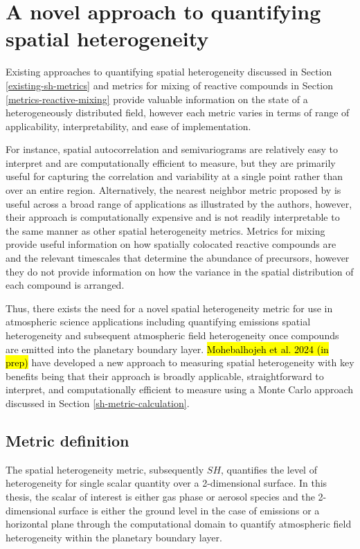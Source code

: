 \section{A novel approach to quantifying spatial heterogeneity}
Existing approaches to quantifying spatial heterogeneity discussed in Section \ref{existing-sh-metrics} and metrics for mixing of reactive compounds in Section \ref{metrics-reactive-mixing} provide valuable information on the state of a heterogeneously distributed field, however each metric varies in terms of range of applicability, interpretability, and ease of implementation. 

For instance, spatial autocorrelation and semivariograms are relatively easy to interpret and are computationally efficient to measure, but they are primarily useful for capturing the correlation and variability at a single point rather than over an entire region. Alternatively, the nearest neighbor metric proposed by \cite{shu_quantifying_2019} is useful across a broad range of applications as illustrated by the authors, however, their approach is computationally expensive and is not readily interpretable to the same manner as other spatial heterogeneity metrics. Metrics for mixing provide useful information on how spatially colocated reactive compounds are and the relevant timescales that determine the abundance of precursors, however they do not provide information on how the variance in the spatial distribution of each compound is arranged. 

Thus, there exists the need for a novel spatial heterogeneity metric for use in atmospheric science applications including quantifying emissions spatial heterogeneity and subsequent atmospheric field heterogeneity once compounds are emitted into the planetary boundary layer. \hl{Mohebalhojeh et al. 2024 (in prep)} have developed a new approach to measuring spatial heterogeneity with key benefits being that their approach is broadly applicable, straightforward to interpret, and computationally efficient to measure using a Monte Carlo approach discussed in Section \ref{sh-metric-calculation}.

\subsection{Metric definition}
The spatial heterogeneity metric, subsequently $SH$, quantifies the level of heterogeneity for single scalar quantity over a 2-dimensional surface. In this thesis, the scalar of interest is either gas phase or aerosol species and the 2-dimensional surface is either the ground level in the case of emissions or a horizontal plane through the computational domain to quantify atmospheric field heterogeneity within the planetary boundary layer.

